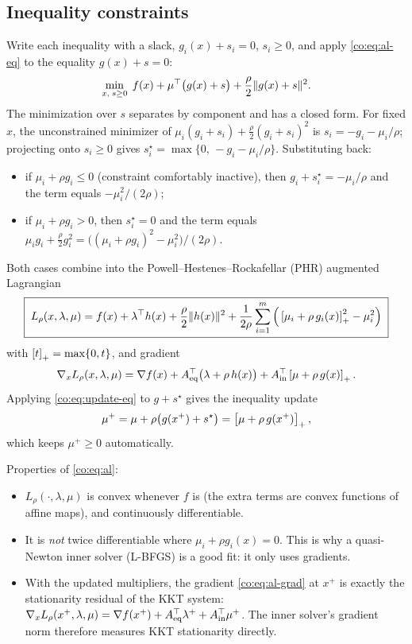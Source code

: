\subsection{Inequality constraints}
Write each inequality with a slack, $g_i(x) + s_i = 0$, $s_i\ge 0$, and apply
\eqref{co:eq:al-eq} to the equality $g(x)+s=0$:
\[
  \min_{x,\; s\ge 0}\; f(x) + \mu^\top\big(g(x)+s\big) + \frac{\rho}{2}\lVert g(x)+s\rVert^2 .
\]
The minimization over $s$ separates by component and has a closed form. For
fixed $x$, the unconstrained minimizer of
$\mu_i(g_i+s_i)+\tfrac{\rho}{2}(g_i+s_i)^2$ is $s_i=-g_i-\mu_i/\rho$; projecting
onto $s_i\ge 0$ gives $s_i^\star = \max\{0,\,-g_i-\mu_i/\rho\}$. Substituting back:
\begin{itemize}
  \item if $\mu_i+\rho g_i \le 0$ (constraint comfortably inactive), then
        $g_i+s_i^\star=-\mu_i/\rho$ and the term equals $-\mu_i^2/(2\rho)$;
  \item if $\mu_i+\rho g_i > 0$, then $s_i^\star=0$ and the term equals
        $\mu_i g_i+\tfrac{\rho}{2}g_i^2 = \big((\mu_i+\rho g_i)^2-\mu_i^2\big)/(2\rho)$.
\end{itemize}
Both cases combine into the Powell--Hestenes--Rockafellar (PHR) augmented
Lagrangian
\begin{equation}\label{co:eq:al}
  \boxed{\;
  L_\rho(x,\lambda,\mu) = f(x) + \lambda^\top h(x) + \frac{\rho}{2}\lVert h(x)\rVert^2
  + \frac{1}{2\rho}\sum_{i=1}^m\Big(\left[\mu_i+\rho\,g_i(x)\right]_+^2 - \mu_i^2\Big)
  \;}
\end{equation}
with $\left[t\right]_+=\max\{0,t\}$, and gradient
\begin{equation}\label{co:eq:al-grad}
  \nabla_x L_\rho(x,\lambda,\mu)
  = \nabla f(x) + A_{\mathrm{eq}}^\top\big(\lambda+\rho\,h(x)\big) + A_{\mathrm{in}}^\top\left[\mu+\rho\,g(x)\right]_+ .
\end{equation}
Applying \eqref{co:eq:update-eq} to $g+s^\star$ gives the inequality update
\begin{equation}\label{co:eq:update-in}
  \mu^+ = \mu + \rho\big(g(x^+)+s^\star\big) = \left[\mu + \rho\, g(x^+)\right]_+ ,
\end{equation}
which keeps $\mu^+\ge 0$ automatically.

Properties of \eqref{co:eq:al}:
\begin{itemize}
  \item $L_\rho(\cdot,\lambda,\mu)$ is convex whenever $f$ is (the extra terms
        are convex functions of affine maps), and continuously differentiable.
  \item It is \emph{not} twice differentiable where $\mu_i+\rho g_i(x)=0$.
        This is why a quasi-Newton inner solver (L-BFGS) is a good fit: it
        only uses gradients.
  \item With the updated multipliers, the gradient
        \eqref{co:eq:al-grad} at $x^+$ is exactly the stationarity residual of the
        KKT system:
        $\nabla_x L_\rho(x^+,\lambda,\mu) = \nabla f(x^+)+A_{\mathrm{eq}}^\top\lambda^+ +A_{\mathrm{in}}^\top\mu^+$.
        The inner solver's gradient norm therefore measures KKT stationarity
        directly.
\end{itemize}

